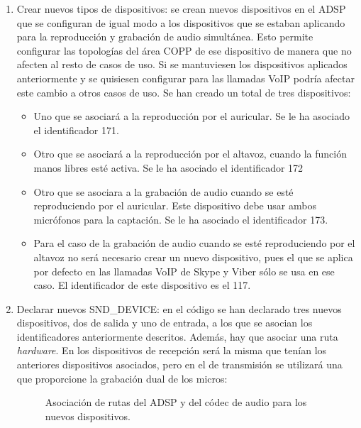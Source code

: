 \begin{enumerate}
	\item Crear nuevos tipos de dispositivos: se crean nuevos dispositivos en el \gls{ADSP} que se configuran de igual modo a los dispositivos que se estaban aplicando para la reproducción y grabación de audio simultánea. Esto permite configurar las topologías del área \gls{COPP} de ese dispositivo de manera que no afecten al resto de casos de uso. Si se mantuviesen los dispositivos aplicados anteriormente y se quisiesen configurar para las llamadas \gls{VoIP} podría afectar este cambio a otros casos de uso. Se han creado un total de tres dispositivos:
	\begin{itemize}
		\item{Uno que se asociará a la reproducción por el auricular. Se le ha asociado el identificador 171. }
		\item{Otro que se asociará a la reproducción por el altavoz, cuando la función manos libres esté activa. Se le ha asociado el identificador 172}
		\item{Otro que se asociara a la grabación de audio cuando se esté reproduciendo por el auricular. Este dispositivo debe usar ambos micrófonos para la captación. Se le ha asociado el identificador 173.}
		\item{Para el caso de la grabación de audio cuando se esté reproduciendo por el altavoz no será necesario crear un nuevo dispositivo, pues el que se aplica por defecto en las llamadas \gls{VoIP} de Skype y Viber sólo se usa en ese caso. El identificador de este dispositivo es el 117.}
	\end{itemize}
	\item Declarar nuevos SND\_DEVICE: en el código se han declarado tres nuevos dispositivos, dos de salida y uno de entrada, a los que se asocian los identificadores anteriormente descritos. Además, hay que asociar una ruta \textit{hardware}. En los dispositivos de recepción será la misma que tenían los anteriores dispositivos asociados, pero en el de transmisión se utilizará una que proporcione la grabación dual de los micros:
	\begin{figure}[H]
		\centering
		\caption{Asociación de rutas del \gls{ADSP} y del códec de audio para los nuevos dispositivos.} \label{fig:snd_voip_asociacion}

\end{figure}
\end{enumerate}
